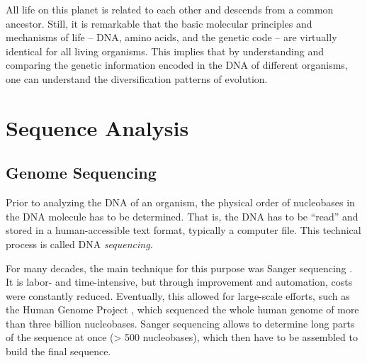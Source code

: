 All life on this planet is related to each other and descends from a common ancestor.
Still, it is remarkable that the basic molecular principles and mechanisms of life
-- DNA, amino acids, and the genetic code -- are virtually identical for all living organisms.
This implies that by understanding and comparing the genetic information encoded in the DNA of different organisms,
one can understand the diversification patterns of evolution.


\section{Sequence Analysis}
\label{ch:Foundations:sec:SequenceAnalysis}


\subsection{Genome Sequencing}
\label{ch:Foundations:sec:SequenceAnalysis:sub:GenomeSequencing}

Prior to analyzing the DNA of an organism, the physical order of nucleobases in the DNA molecule has to be determined.
That is, the DNA has to be ``read'' and stored in a human-accessible text format, typically a computer file.
This technical process is called DNA \emph{sequencing}.

For many decades, the main technique for this purpose was Sanger sequencing \cite{Sanger1975,Sanger1977}.
It is labor- and time-intensive, but through improvement and automation, costs were constantly reduced.
Eventually, this allowed for large-scale efforts, such as the Human Genome Project \cite{Venter2001},
which sequenced the whole human genome of more than three billion nucleobases.
Sanger sequencing allows to determine long parts of the sequence at once (> \num{500} nucleobases),
which then have to be assembled to build the final sequence.

